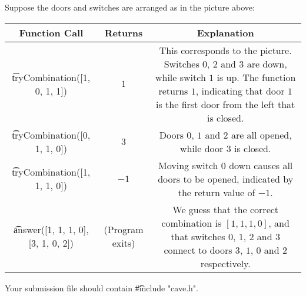 Suppose the doors and switches are arranged as in the picture above:
\begin{center}
\renewcommand{\arraystretch}{2.2}
\begin{tabular}{ |c|c|c| }
\hline
Function Call & Returns & Explanation\\
\hline
\t{tryCombination([1, 0, 1, 1])} & $1$ & \parbox{7cm}{\centering \vspace{2mm} This corresponds to the picture. Switches $0$, $2$ and $3$ are down, while switch $1$ is up. The function returns $1$, indicating that door $1$ is the first door from the left that is closed.\\\vspace{2mm}}\\
\hline
\t{tryCombination([0, 1, 1, 0])} & 3 & \parbox{7cm}{\centering \vspace{2mm}Doors $0$, $1$ and $2$ are all opened, while door $3$ is closed.\\\vspace{2mm}}\\
\hline
\t{tryCombination([1, ­1, 1, 0])} & $-1$ & \parbox{7cm}{\centering \vspace{2mm}Moving switch $0$ down causes all doors to be opened, indicated by the return value of ­$-1$.\\\vspace{2mm}}\\
\hline
\t{answer([1, 1, 1, 0],[3, 1, 0, 2])} & (Program exits) &\parbox{7cm}{\centering \vspace{2mm}We guess that the correct combination is $[1,1, 1,0]$, and that switches $0$, $1$, $2$ and $3$ connect to doors $3$, $1$, $0$ and $2$ respectively.\\\vspace{2mm}}\\
\hline
\end{tabular}
\end{center}
Your submission file should contain \t{\#include "cave.h"}.